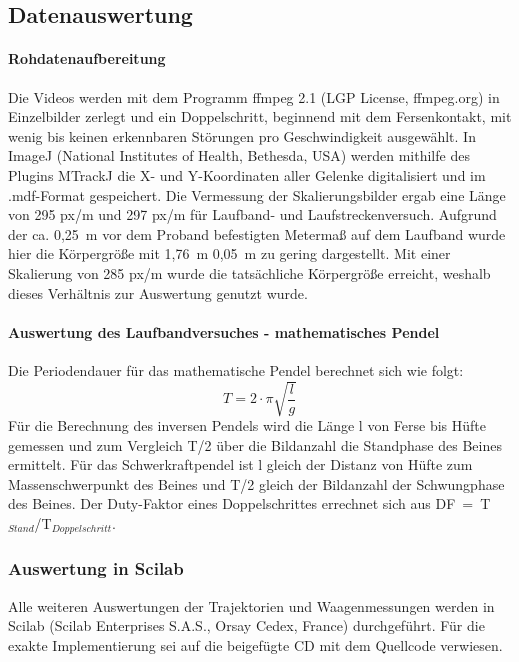 \subsection{Datenauswertung}
\paragraph{Rohdatenaufbereitung}
Die Videos werden mit dem Programm ffmpeg 2.1 (LGP License, ffmpeg.org) in Einzelbilder zerlegt und ein Doppelschritt, beginnend mit dem Fersenkontakt, mit wenig bis keinen erkennbaren Störungen pro Geschwindigkeit ausgewählt. In ImageJ (National Institutes of Health, Bethesda, USA) werden mithilfe des Plugins MTrackJ \autocite{meijering2012methods} die X- und Y-Koordinaten aller Gelenke digitalisiert und im .mdf-Format gespeichert. Die Vermessung der Skalierungsbilder ergab eine Länge von 295 px/m und 297 px/m für Laufband- und Laufstreckenversuch. Aufgrund der ca. 0,25~m vor dem Proband befestigten Metermaß auf dem Laufband wurde hier die Körpergröße mit 1,76~m 0,05~m zu gering dargestellt. Mit einer Skalierung von 285 px/m wurde die tatsächliche Körpergröße erreicht, weshalb dieses Verhältnis zur Auswertung genutzt wurde.
\paragraph{Auswertung des Laufbandversuches - mathematisches Pendel}
Die Periodendauer für das mathematische Pendel berechnet sich wie folgt:
\begin{equation}
T = 2 \cdot \pi \sqrt{\frac{l}{g}}
\end{equation}
Für die Berechnung des inversen Pendels wird die Länge l von Ferse bis Hüfte gemessen und zum Vergleich T/2 über die Bildanzahl die Standphase des Beines ermittelt. Für das Schwerkraftpendel ist l gleich der Distanz von Hüfte zum Massenschwerpunkt des Beines und T/2 gleich der Bildanzahl der Schwungphase des Beines. Der Duty-Faktor eines Doppelschrittes errechnet sich aus DF~=~T$_{Stand}$/T$_{Doppelschritt}$.
\subsubsection*{Auswertung in Scilab}
Alle weiteren Auswertungen der Trajektorien und Waagenmessungen werden in Scilab (Scilab Enterprises S.A.S., Orsay Cedex, France) durchgeführt. Für die exakte Implementierung sei auf die beigefügte CD mit dem Quellcode verwiesen.

